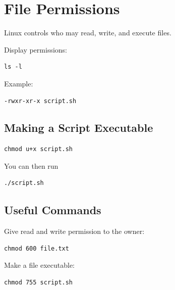\section{File Permissions} 

Linux controls who may read, write, and execute files. 

Display permissions: 

\begin{lstlisting} 
ls -l 
\end{lstlisting} 

Example: 

\begin{lstlisting} 
-rwxr-xr-x script.sh 
\end{lstlisting} 

\subsection{Making a Script Executable} 

\begin{lstlisting} 
chmod u+x script.sh 
\end{lstlisting} 

You can then run 

\begin{lstlisting} 
./script.sh 
\end{lstlisting} 

\subsection{Useful Commands} 

Give read and write permission to the owner: 

\begin{lstlisting} 
chmod 600 file.txt 
\end{lstlisting} 

Make a file executable: 

\begin{lstlisting} 
chmod 755 script.sh 
\end{lstlisting}